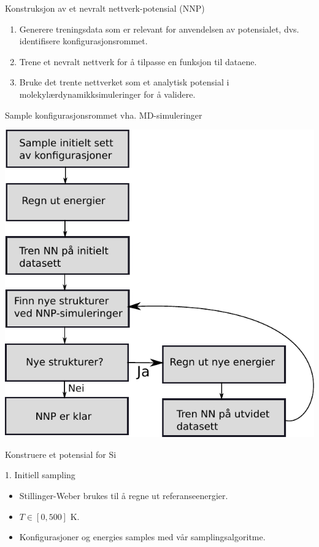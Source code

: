 \documentclass{beamer}
\begin{document}
\begin{frame}

\begin{block}{Konstruksjon av et nevralt nettverk-potensial (NNP)}
 \begin{enumerate}
  \item Generere treningsdata som er relevant for anvendelsen av potensialet, dvs. identifisere konfigurasjonsrommet. 
  \item Trene et nevralt nettverk for å tilpasse en funksjon til dataene. 
  \item Bruke det trente nettverket som et analytisk potensial i molekylærdynamikksimuleringer for å validere.  
 \end{enumerate}
\end{block}

\end{frame}


\begin{frame}{Sample konfigurasjonsrommet vha. MD-simuleringer}
 
\centering
\includegraphics[width=0.7\linewidth]{../Figures/Presentation/iterativeSampling.pdf} 

\end{frame}


\begin{frame}{Konstruere et potensial for Si}

\begin{block}{1. Initiell sampling}
 \begin{itemize}
  \item Stillinger-Weber brukes til å regne ut referanseenergier.  
  \item $T \in [0,500]$ K. 
  \item Konfigurasjoner og energies samples med vår samplingsalgoritme.  
 \end{itemize}
\end{block}

\end{frame}
\end{document}
